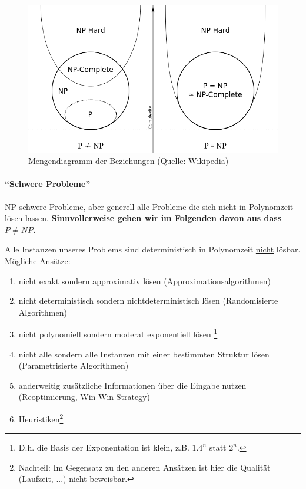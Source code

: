 \begin{figure}[h]
    \centering
    \includegraphics[scale=0.4]{images/np-hard-complete.png}
    \caption{Mengendiagramm der Beziehungen (Quelle: \href{https://commons.wikimedia.org/w/index.php?curid=3532181}{Wikipedia})}
    \label{fig:np-hard-complete}
\end{figure}

\paragraph{``Schwere Probleme''}
NP-schwere Probleme, aber generell alle Probleme die sich nicht in Polynomzeit lösen lassen.
\textbf{Sinnvollerweise gehen wir im Folgenden davon aus dass $P \neq NP$.}

Alle Instanzen unseres Problems sind deterministisch in Polynomzeit \underline{nicht} lösbar.
Mögliche Ansätze:
\begin{enumerate}[label=\alph*)]
    \item nicht exakt sondern approximativ lösen (Approximationsalgorithmen)
    \item nicht deterministisch sondern nichtdeterministisch lösen (Randomisierte Algorithmen)
    \item nicht polynomiell sondern moderat exponentiell lösen%
    \footnote{D.h. die Basis der Exponentation ist klein, z.B. $1.4^n$ statt $2^n$.}
    \item nicht alle sondern alle Instanzen mit einer bestimmten Struktur lösen (Parametrisierte Algorithmen)
    \item anderweitig zusätzliche Informationen über die Eingabe nutzen (Reoptimierung, Win-Win-Strategy)
    \item Heuristiken\footnote{Nachteil: Im Gegensatz zu den anderen Ansätzen ist hier die Qualität (Laufzeit, ...) nicht beweisbar.}
\end{enumerate}


